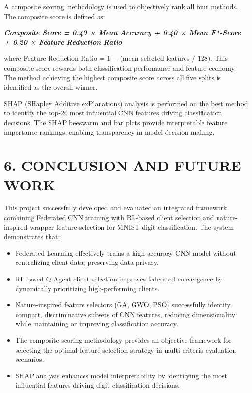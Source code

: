 \documentclass[
]{article}
\begin{document}
A composite scoring methodology is used to objectively rank all four
methods. The composite score is defined as:

\emph{\textbf{Composite Score = 0.40 × Mean Accuracy + 0.40 × Mean
F1-Score + 0.20 × Feature Reduction Ratio}}

where Feature Reduction Ratio = 1 − (mean selected features / 128). This
composite score rewards both classification performance and feature
economy. The method achieving the highest composite score across all
five splits is identified as the overall winner.

SHAP (SHapley Additive exPlanations) analysis is performed on the best
method to identify the top-20 most influential CNN features driving
classification decisions. The SHAP beeswarm and bar plots provide
interpretable feature importance rankings, enabling transparency in
model decision-making.

\hypertarget{conclusion-and-future-work}{%
\section{6. CONCLUSION AND FUTURE
WORK}\label{conclusion-and-future-work}}

This project successfully developed and evaluated an integrated
framework combining Federated CNN training with RL-based client
selection and nature-inspired wrapper feature selection for MNIST digit
classification. The system demonstrates that:

\begin{itemize}
\item
  Federated Learning effectively trains a high-accuracy CNN model
  without centralizing client data, preserving data privacy.
\item
  RL-based Q-Agent client selection improves federated convergence by
  dynamically prioritizing high-performing clients.
\item
  Nature-inspired feature selectors (GA, GWO, PSO) successfully identify
  compact, discriminative subsets of CNN features, reducing
  dimensionality while maintaining or improving classification accuracy.
\item
  The composite scoring methodology provides an objective framework for
  selecting the optimal feature selection strategy in multi-criteria
  evaluation scenarios.
\item
  SHAP analysis enhances model interpretability by identifying the most
  influential features driving digit classification decisions.
\end{itemize}
\end{document}
